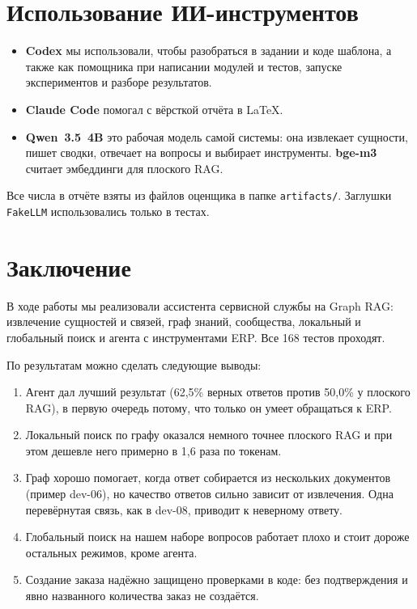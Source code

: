 \documentclass[a4paper,12pt]{article}
\newcommand{\code}[1]{\texttt{#1}}
\begin{document}
\section{Использование ИИ-инструментов}

\begin{itemize}
\item \textbf{Codex} мы использовали, чтобы разобраться в задании и коде шаблона, а также как помощника при написании модулей и тестов, запуске экспериментов и разборе результатов.
\item \textbf{Claude Code} помогал с вёрсткой отчёта в \LaTeX.
\item \textbf{Qwen~3.5~4B} это рабочая модель самой системы: она извлекает сущности, пишет сводки, отвечает на вопросы и выбирает инструменты. \textbf{bge-m3} считает эмбеддинги для плоского RAG.
\end{itemize}

Все числа в отчёте взяты из файлов оценщика в папке \code{artifacts/}. Заглушки \code{FakeLLM} использовались только в тестах.

\section*{Заключение}

В ходе работы мы реализовали ассистента сервисной службы на Graph RAG: извлечение сущностей и связей, граф знаний, сообщества, локальный и глобальный поиск и агента с инструментами ERP. Все 168 тестов проходят.

По результатам можно сделать следующие выводы:
\begin{enumerate}
\item Агент дал лучший результат (62,5\% верных ответов против 50,0\% у плоского RAG), в первую очередь потому, что только он умеет обращаться к ERP.
\item Локальный поиск по графу оказался немного точнее плоского RAG и при этом дешевле него примерно в 1,6 раза по токенам.
\item Граф хорошо помогает, когда ответ собирается из нескольких документов (пример dev-06), но качество ответов сильно зависит от извлечения. Одна перевёрнутая связь, как в dev-08, приводит к неверному ответу.
\item Глобальный поиск на нашем наборе вопросов работает плохо и стоит дороже остальных режимов, кроме агента.
\item Создание заказа надёжно защищено проверками в коде: без подтверждения и явно названного количества заказ не создаётся.
\end{enumerate}
\end{document}
